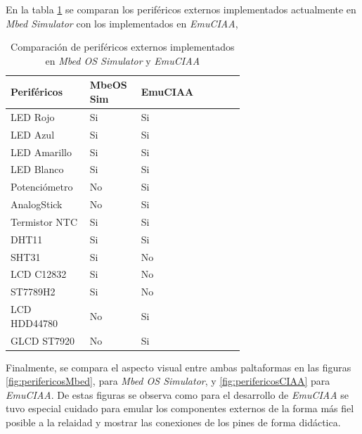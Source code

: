 En la tabla \ref{tab:perifericosExternosMBED} se comparan los periféricos externos implementados actualmente en \textit{Mbed Simulator} con los implementados en \textit{EmuCIAA},

\hfill \break
\hfill \break
\hfill \break
\hfill \break
\hfill \break
\hfill \break
\hfill \break
\hfill \break
\hfill \break
\hfill \break
\hfill \break

\begin{table}[htbp]
\centering
\caption[Periféricos externos]{Comparación de periféricos externos implementados en \textit{Mbed OS Simulator} y  \textit{EmuCIAA}}
\begin{tabular}{p{0.24\linewidth} p{0.14\linewidth}  p{0.14\linewidth}  p{0.14\linewidth}}
\toprule
\textbf{Periféricos} 
& \textbf{MbeOS Sim}
& \textbf{EmuCIAA}
\\
\midrule
LED Rojo & Si & Si \\
LED Azul & Si & Si \\
LED Amarillo & Si & Si \\
LED Blanco & Si & Si \\
Potenciómetro & No & Si \\
AnalogStick & No & Si \\
Termistor NTC & Si & Si \\
DHT11 & Si & Si  \\
SHT31 & Si & No \\
LCD C12832 & Si & No  \\
ST7789H2 & Si & No \\
LCD HDD44780 & No & Si  \\
GLCD ST7920 & No & Si  \\
\bottomrule
\hline
\end{tabular}
\label{tab:perifericosExternosMBED}
\end{table}

Finalmente, se compara el aspecto visual entre ambas paltaformas en las figuras \ref{fig:perifericosMbed}, para \textit{Mbed OS Simulator}, y \ref{fig:perifericosCIAA} para \textit{EmuCIAA}. De estas figuras se observa como para el desarrollo de \textit{EmuCIAA} se tuvo especial cuidado para emular los componentes externos de la forma más fiel posible a la relaidad y mostrar las conexiones de los pines de forma didáctica.

